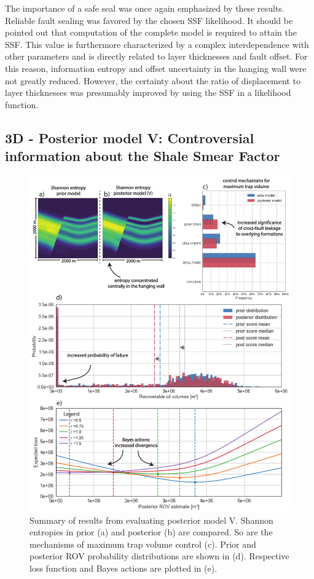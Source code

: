 		The importance of a safe seal was once again emphasized by these results. Reliable fault sealing was favored by the chosen SSF likelihood. It should be pointed out that computation of the complete model is required to attain the SSF. This value is furthermore characterized by a complex interdependence with other parameters and is directly related to layer thicknesses and fault offset. For this reason, information entropy and offset uncertainty in the hanging wall were not greatly reduced. However, the certainty about the ratio of displacement to layer thicknesses was presumably improved by using the SSF in a likelihood function.
		
		\subsection{3D - Posterior model V: Controversial information about the Shale Smear Factor}\label{sec:model5}%
		\begin{figure}[p!]
			\centering
			\includegraphics[width=1\textwidth]{Figures/ML5}
			\caption{Summary of results from evaluating posterior model V. Shannon entropies in prior (a) and posterior (b) are compared. So are the mechanisms of maximum trap volume control (c). Prior and posterior ROV probability distributions are shown in (d). Respective loss function and Bayes actions are plotted in (e).}\label{fig:ML5}
		\end{figure}
